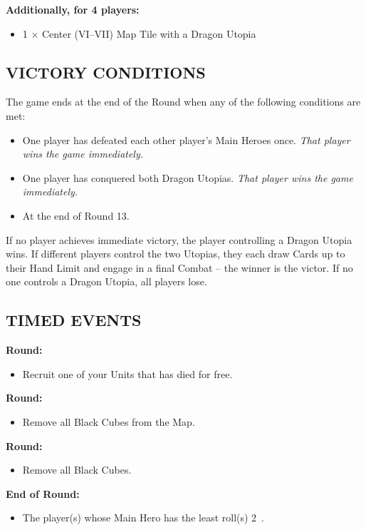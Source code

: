 \begin{multicols*}{2}
\textbf{Additionally, for 4 players:}
\begin{itemize}
  \item 1 × Center (VI–VII) Map Tile with a Dragon Utopia
\end{itemize}

\subsection*{\MakeUppercase{Victory Conditions}}
The game ends at the end of the Round when any of the following conditions are met:

\begin{itemize}
 \item One player has defeated each other player's Main Heroes once. \textit{That player wins the game immediately.}
 \item One player has conquered both Dragon Utopias. \textit{That player wins the game immediately.}
 \item At the end of Round 13.
\end{itemize}

If no player achieves immediate victory, the player controlling a Dragon Utopia wins.
If different players control the two Utopias, they each draw Cards up to their Hand Limit and engage in a final Combat -- the winner is the victor.
If no one controls a Dragon Utopia, all players lose.
\subsection*{\MakeUppercase{Timed Events}}

\textbf{ Round:}
\begin{itemize}
  \item Recruit one of your Units that has died for free.
\end{itemize}
\textbf{ Round:}
\begin{itemize}
  \item Remove all Black Cubes from the Map.
\end{itemize}
\textbf{ Round:}
\begin{itemize}
  \item Remove all Black Cubes.
\end{itemize}
\textbf{End of  Round:}
\begin{itemize}
  \item The player(s) whose Main Hero has the least  roll(s) 2~.
\end{itemize}


\end{multicols*}
